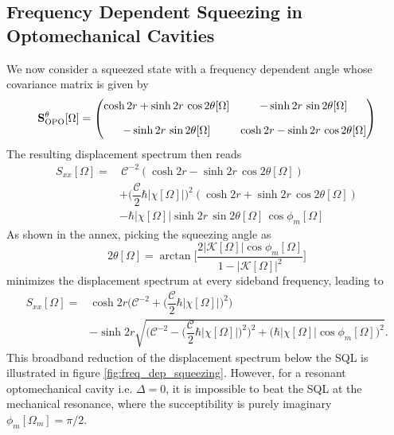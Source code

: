 \subsection{Frequency Dependent Squeezing in Optomechanical Cavities}
We now consider a squeezed state with a frequency dependent angle whose covariance matrix is given by
\begin{equation*}
      \mathbf{S}^{\theta}_{\rm OPO}[\Omega] =\begin{pmatrix}
         \cosh 2r  + \sinh 2r \, \cos 2\theta[\Omega]  & -\sinh 2r \, \sin 2\theta[\Omega]  \\[10pt]
        -\sinh 2r \, \sin 2\theta[\Omega]  & \cosh 2r  - \sinh 2r \, \cos 2\theta[\Omega] 
      \end{pmatrix}
\end{equation*}
The resulting displacement spectrum then reads
\begin{equation}
  \begin{split}
      S_{xx}[\Omega] = & \, \mathcal{C}^{-2} (\cosh 2r  - \sinh 2r \, \cos 2\theta[\Omega])\\
      & +  \bigg(\dfrac{\mathcal{C} }{2} \hbar |\chi[\Omega]| \bigg)^2( \cosh 2r  + \sinh 2r \, \cos 2\theta[\Omega]) \\
      & - \hbar |\chi[\Omega]| \sinh 2r \, \sin 2\theta[\Omega] \, \cos \phi_m[\Omega]
  \end{split}
\end{equation}
As shown in the annex, picking the squeezing angle as
\begin{equation}
  2 \theta[\Omega] = \arctan \Big[\dfrac{2|\mathcal{K}[\Omega]|\cos \phi_m[\Omega]}{1 - |\mathcal{K}[\Omega]|^2}\Big]
\end{equation}
minimizes the displacement spectrum at every sideband frequency, leading to
\begin{equation}
\begin{split}
  S_{xx}[\Omega] = & \cosh 2r \Bigg(\mathcal{C}^{-2}  + \bigg(\dfrac{\mathcal{C} }{2} \hbar |\chi[\Omega]| \bigg)^2\Bigg)  \\
  & -  \sinh 2r \sqrt{\Bigg(\mathcal{C}^{-2}  - \bigg(\dfrac{\mathcal{C} }{2} \hbar |\chi[\Omega]| \bigg)^2\Bigg)^2 + \bigg(\hbar |\chi[\Omega]|\cos \phi_m[\Omega]\bigg)^2}.
\end{split}
\end{equation}
This broadband reduction of the displacement spectrum below the SQL is illustrated in figure \ref{fig:freq_dep_squeezing}. However, for a resonant optomechanical cavity i.e. $\Delta=0$, it is impossible to beat the SQL at the mechanical resonance, where the succeptibility is purely imaginary $\phi_m[\Omega_m] = \pi/2$. \\ 

